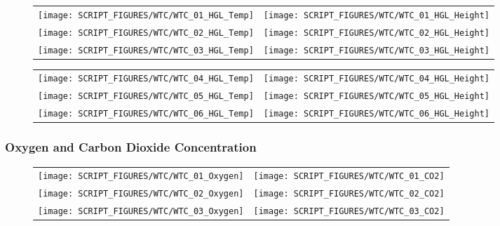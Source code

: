 \begin{figure}[h!]
\begin{tabular*}{\textwidth}{l@{\extracolsep{\fill}}r}
\texttt{[image: SCRIPT\_FIGURES/WTC/WTC\_01\_HGL\_Temp]} &
\texttt{[image: SCRIPT\_FIGURES/WTC/WTC\_01\_HGL\_Height]} \\
\texttt{[image: SCRIPT\_FIGURES/WTC/WTC\_02\_HGL\_Temp]} &
\texttt{[image: SCRIPT\_FIGURES/WTC/WTC\_02\_HGL\_Height]} \\
\texttt{[image: SCRIPT\_FIGURES/WTC/WTC\_03\_HGL\_Temp]} &
\texttt{[image: SCRIPT\_FIGURES/WTC/WTC\_03\_HGL\_Height]}
\end{tabular*}
\end{figure}

\begin{figure}[!ht]
\begin{tabular*}{\textwidth}{l@{\extracolsep{\fill}}r}
\texttt{[image: SCRIPT\_FIGURES/WTC/WTC\_04\_HGL\_Temp]} &
\texttt{[image: SCRIPT\_FIGURES/WTC/WTC\_04\_HGL\_Height]} \\
\texttt{[image: SCRIPT\_FIGURES/WTC/WTC\_05\_HGL\_Temp]} &
\texttt{[image: SCRIPT\_FIGURES/WTC/WTC\_05\_HGL\_Height]} \\
\texttt{[image: SCRIPT\_FIGURES/WTC/WTC\_06\_HGL\_Temp]} &
\texttt{[image: SCRIPT\_FIGURES/WTC/WTC\_06\_HGL\_Height]}
\end{tabular*}
\end{figure}

\clearpage

\subsubsection{Oxygen and Carbon Dioxide Concentration}

\begin{figure}[h!]
\begin{tabular*}{\textwidth}{l@{\extracolsep{\fill}}r}
\texttt{[image: SCRIPT\_FIGURES/WTC/WTC\_01\_Oxygen]} &
\texttt{[image: SCRIPT\_FIGURES/WTC/WTC\_01\_CO2]} \\
\texttt{[image: SCRIPT\_FIGURES/WTC/WTC\_02\_Oxygen]} &
\texttt{[image: SCRIPT\_FIGURES/WTC/WTC\_02\_CO2]} \\
\texttt{[image: SCRIPT\_FIGURES/WTC/WTC\_03\_Oxygen]} &
\texttt{[image: SCRIPT\_FIGURES/WTC/WTC\_03\_CO2]}
\end{tabular*}
\label{NIST_WTC_Oxygen_CO2_1}
\end{figure}


